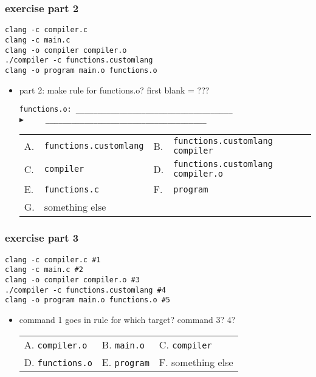 \begin{FragileFrame}
\frametitle{exercise part 2}
\begin{Verbatim}[frame=single,fontsize=\fontsize{12}{13}]
clang -c compiler.c
clang -c main.c
clang -o compiler compiler.o
./compiler -c functions.customlang
clang -o program main.o functions.o
\end{Verbatim}
    \begin{itemize}
    \item part 2: make rule for functions.o? first blank = ???
\begin{Verbatim}[frame=single,fontsize=\fontsize{11}{12}]
functions.o: ____________________________________
▶     _____________________________________
\end{Verbatim}
\begin{tabular}{llll}
A. & \texttt{functions.customlang} & B. & \texttt{functions.customlang compiler} \\
C. & \texttt{compiler} & D. & \texttt{functions.customlang compiler.o} \\
E. & \texttt{functions.c} & F. & \texttt{program} \\
G. & something else\\
\end{tabular}
    \end{itemize}
\end{FragileFrame}

\begin{FragileFrame}
\frametitle{exercise part 3}
\begin{Verbatim}[frame=single,fontsize=\fontsize{13}{14}]
clang -c compiler.c #1
clang -c main.c #2
clang -o compiler compiler.o #3
./compiler -c functions.customlang #4
clang -o program main.o functions.o #5
\end{Verbatim}
    \begin{itemize}
    \item command 1 goes in rule for which target? command 3? 4?
\begin{tabular}{lll}
    A. \texttt{compiler.o} & B. \texttt{main.o} & C. \texttt{compiler} \\
    D. \texttt{functions.o} & E. \texttt{program} & F. something else \\
\end{tabular}
    \end{itemize}
\end{FragileFrame}

